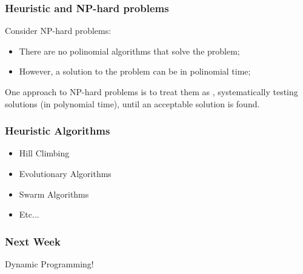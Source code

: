 \documentclass{beamer}
\begin{document}
\begin{frame}
  \frametitle{Heuristic and NP-hard problems}

  Consider NP-hard problems:
  \begin{itemize}
  \item There are no polinomial algorithms that solve the problem;
  \item However, a solution to the problem can be 
    in polinomial time;
  \end{itemize}

  \bigskip

  One approach to NP-hard problems is to treat them as
  , systematically testing solutions 
  (in polynomial time), until an acceptable solution is found.
\end{frame}

\begin{frame}
  \frametitle{Heuristic Algorithms}
  \begin{itemize}
  \item Hill Climbing
  \item Evolutionary Algorithms
  \item Swarm Algorithms
  \item Etc...
  \end{itemize}
\end{frame}

\begin{frame}
  \frametitle{Next Week}
  \begin{center}
    Dynamic Programming!
  \end{center}
\end{frame}
\end{document}
